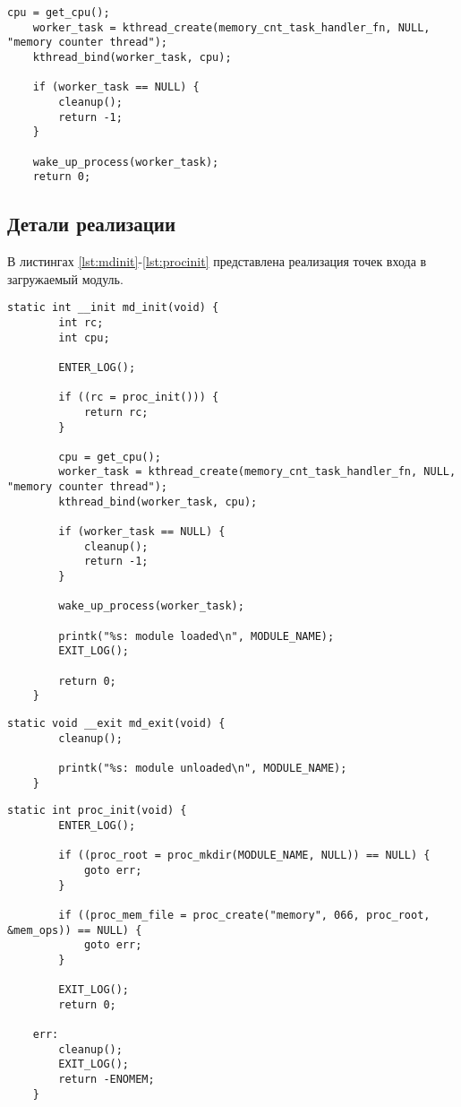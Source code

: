 \begin{lstlisting}[label={lst:threadinit}, caption={инициализация потока ядра}]
	cpu = get_cpu();
	worker_task = kthread_create(memory_cnt_task_handler_fn, NULL, "memory counter thread");
	kthread_bind(worker_task, cpu);
	
	if (worker_task == NULL) {
		cleanup();
		return -1;
	}
	
	wake_up_process(worker_task);
	return 0;
\end{lstlisting}

\subsection{Детали реализации}

В листингах \ref{lst:mdinit}-\ref{lst:procinit} представлена реализация точек входа в загружаемый модуль.

\begin{lstlisting}[label={lst:mdinit}, caption={функция инициализации модуля}]
	static int __init md_init(void) {
		int rc;
		int cpu;
		
		ENTER_LOG();
		
		if ((rc = proc_init())) {
			return rc;
		}
		
		cpu = get_cpu();
		worker_task = kthread_create(memory_cnt_task_handler_fn, NULL, "memory counter thread");
		kthread_bind(worker_task, cpu);
		
		if (worker_task == NULL) {
			cleanup();
			return -1;
		}
		
		wake_up_process(worker_task);
		
		printk("%s: module loaded\n", MODULE_NAME);
		EXIT_LOG();
		
		return 0;
	}
\end{lstlisting}

\begin{lstlisting}[label={lst:mdexit}, caption={функция выхода из модуля}]
	static void __exit md_exit(void) { 
		cleanup();
		
		printk("%s: module unloaded\n", MODULE_NAME); 
	}
\end{lstlisting}

\begin{lstlisting}[label={lst:procinit}, caption={создание директории и файла в /proc}]
	static int proc_init(void) {
		ENTER_LOG();
		
		if ((proc_root = proc_mkdir(MODULE_NAME, NULL)) == NULL) {
			goto err;
		}
		
		if ((proc_mem_file = proc_create("memory", 066, proc_root, &mem_ops)) == NULL) {
			goto err;
		}
		
		EXIT_LOG();
		return 0;
		
	err:
		cleanup();
		EXIT_LOG();
		return -ENOMEM;
	}
\end{lstlisting}

